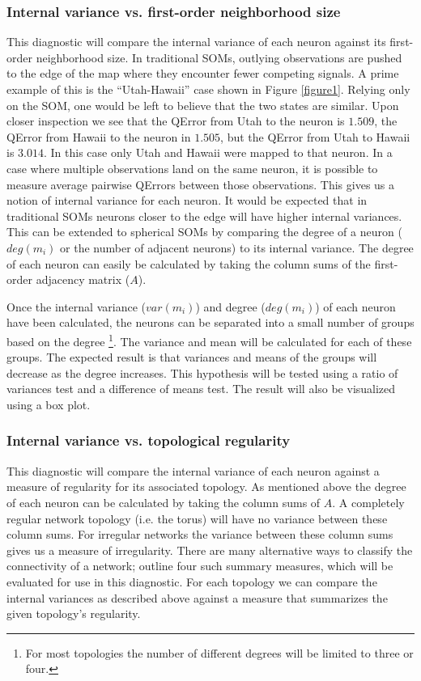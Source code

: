 \documentclass[10pt,titlepage]{article}
\begin{document}
\subsubsection{Internal variance vs. first-order neighborhood size}
This diagnostic will compare the internal variance of each neuron against its
first-order neighborhood size.  In traditional SOMs, outlying observations are
pushed to the edge of the map where they encounter fewer competing signals. A
prime example of this is the ``Utah-Hawaii'' case shown in Figure
\ref{figure1}.  Relying only on the SOM, one would be left to believe that the
two states are similar. Upon closer inspection we see that the QError from
Utah to the neuron is $1.509$, the QError from Hawaii to the neuron in
$1.505$, but the QError from Utah to Hawaii is $3.014$. In this case only Utah
and Hawaii were mapped to that neuron.  In a case where multiple observations
land on the same neuron, it is possible to measure average pairwise QErrors
between those observations.  This gives us a notion of internal variance for
each neuron. It would be expected that in traditional SOMs neurons closer to
the edge will have higher internal variances. This can be extended to
spherical SOMs by comparing the degree of a neuron ($deg(m_i)$ or the number of
adjacent neurons) to its internal variance.  The degree of each neuron can
easily be calculated by taking the column sums of the first-order adjacency
matrix ($A$).

Once the internal variance ($var(m_i)$) and degree ($deg(m_i)$) of each neuron
have been calculated, the neurons can be separated into a small number of
groups based on the degree \footnote{For most topologies the number of
different degrees will be limited to three or four.}.  The variance and mean
will be calculated for each of these groups.  The expected result is that
variances and means of the groups will decrease as the degree increases.  This
hypothesis will be tested using a ratio of variances test and a difference of
means test.  The result will also be visualized using a box plot.

\subsubsection{Internal variance vs. topological regularity}
This diagnostic will compare the internal variance of each neuron against a
measure of regularity for its associated topology.  As mentioned above the
degree of each neuron can be calculated by taking the column sums of $A$.  A
completely regular network topology (i.e. the torus) will have no variance
between these column sums.  For irregular networks the variance between these
column sums gives us a measure of irregularity. There are many alternative
ways to classify the connectivity of a network; \cite{florax95} outline four
such summary measures, which will be evaluated for use in this diagnostic.
For each topology we can compare the internal variances as described above
against a measure that summarizes the given topology's regularity.
\end{document}
